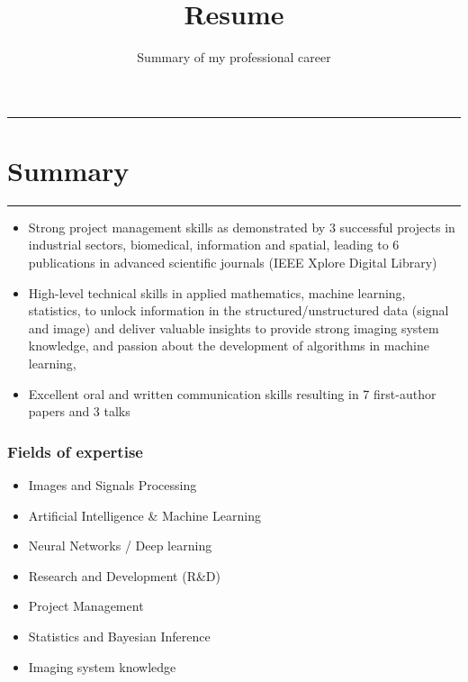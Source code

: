 \documentclass[
]{article}
\title{Resume}
\subtitle{Summary of my professional career}
\date{}
\providecommand{\tightlist}{%
  \setlength{\itemsep}{0pt}\setlength{\parskip}{0pt}}
\begin{document}
\maketitle

\begin{center}\rule{0.5\linewidth}{\linethickness}\end{center}

\hypertarget{summary}{%
\section{Summary}\label{summary}}

\begin{center}\rule{0.5\linewidth}{\linethickness}\end{center}

\begin{itemize}
\item
  Strong project management skills as demonstrated by 3 successful
  projects in industrial sectors, biomedical, information and spatial,
  leading to 6 publications in advanced scientific journals (IEEE Xplore
  Digital Library)
\item
  High-level technical skills in applied mathematics, machine learning,
  statistics, to unlock information in the structured/unstructured data
  (signal and image) and deliver valuable insights to provide strong
  imaging system knowledge, and passion about the development of
  algorithms in machine learning,
\item
  Excellent oral and written communication skills resulting in 7
  first-author papers and 3 talks
\end{itemize}

\hypertarget{fields-of-expertise}{%
\subsubsection{Fields of expertise}\label{fields-of-expertise}}

\begin{itemize}
\tightlist
\item
  Images and Signals Processing
\item
  Artificial Intelligence \& Machine Learning
\item
  Neural Networks / Deep learning
\item
  Research and Development (R\&D)
\item
  Project Management
\item
  Statistics and Bayesian Inference
\item
  Imaging system knowledge
\end{itemize}
\end{document}
